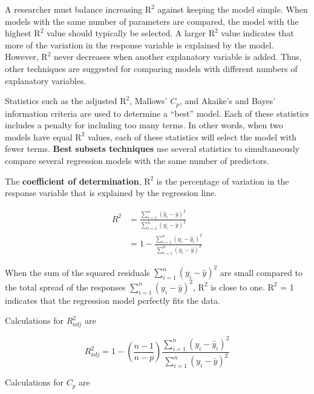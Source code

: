 \documentclass[
]{book}
\begin{document}
A researcher must balance increasing \(\mathrm{R}^2\) against keeping the model simple. When models with the same number of parameters are compared, the model with the highest \(\mathrm{R}^2\) value should typically be selected. A larger \(\mathrm{R}^2\) value indicates that more of the variation in the response variable is explained by the model. However, \(\mathrm{R}^2\) never decreases when another explanatory variable is added. Thus, other techniques are suggested for comparing models with different numbers of explanatory variables.

Statistics such as the adjusted \(\mathrm{R}^2\), Mallows' \(C_p\), and Akaike's and Bayes' information criteria are used to determine a ``best'' model. Each of these statistics includes a penalty for including too many terms. In other words, when two models have equal \(\mathrm{R}^2\) values, each of these statistics will select the model with fewer terms. \textbf{Best subsets techniques} use several statistics to simultaneously compare several regression models with the same number of predictors.

The \textbf{coefficient of determination}, \textbf{\(\mathrm{R}^2\)} is the percentage of variation in the response variable that is explained by the regression line.

\begin{equation}
\label{R2}
\begin{split}
R^2 &= \frac{\sum_{i=1}^{n}(\hat{y}_i - \bar{y})^2}{\sum_{i=1}^{n}({y}_i - \bar{y})^2} \\
    &= 1 - \frac{\sum_{i=1}^{n}({y}_i - \hat{y}_i)^2}{\sum_{i=1}^{n}({y}_i - \bar{y})^2}
\end{split}
\tag{3.2}
\end{equation}

When the sum of the squared residuals \({\sum_{i=1}^{n}({y}_i - \hat{y})^2}\) are small compared to the total spread of the responses \({\sum_{i=1}^{n}({y}_i - \bar{y})^2}\), \(\mathrm{R}^2\) is close to one. \(\mathrm{R}^2\) = 1 indicates that the regression model perfectly fits the data.

Calculations for \(R^2_{adj}\) are

\begin{equation}
\label{R2Adj}
R^2_{adj}  = 1 - (\frac{n-1}{n-p})\frac{\sum_{i=1}^{n}({y}_i - \hat{y}_i)^2}{\sum_{i=1}^{n}({y}_i - \bar{y})^2}
\tag{3.3}
\end{equation}

Calculations for \(C_p\) are
\end{document}
